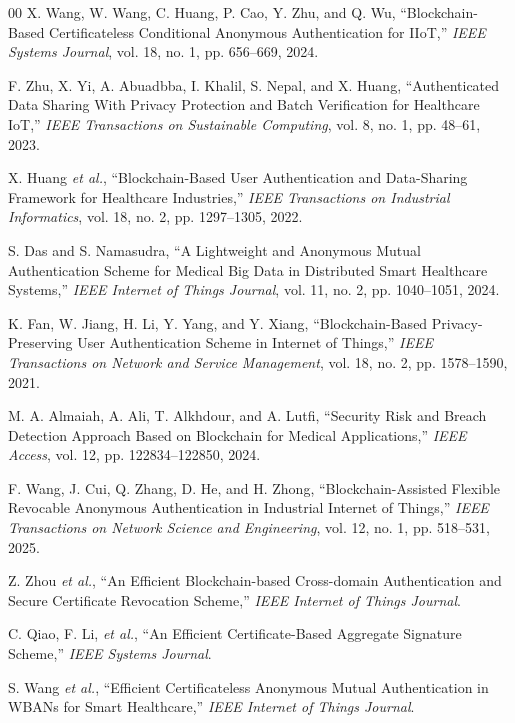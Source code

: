 \documentclass[conference]{IEEEtran}
\begin{document}
\begin{thebibliography}{00}
 X. Wang, W. Wang, C. Huang, P. Cao, Y. Zhu, and Q. Wu,
``Blockchain-Based Certificateless Conditional Anonymous Authentication for IIoT,''
\textit{IEEE Systems Journal}, vol. 18, no. 1, pp. 656--669, 2024.

 F. Zhu, X. Yi, A. Abuadbba, I. Khalil, S. Nepal, and X. Huang,
``Authenticated Data Sharing With Privacy Protection and Batch Verification for Healthcare IoT,''
\textit{IEEE Transactions on Sustainable Computing}, vol. 8, no. 1, pp. 48--61, 2023.

 X. Huang \textit{et al.},
``Blockchain-Based User Authentication and Data-Sharing Framework for Healthcare Industries,''
\textit{IEEE Transactions on Industrial Informatics}, vol. 18, no. 2, pp. 1297--1305, 2022.

 S. Das and S. Namasudra,
``A Lightweight and Anonymous Mutual Authentication Scheme for Medical Big Data in Distributed Smart Healthcare Systems,''
\textit{IEEE Internet of Things Journal}, vol. 11, no. 2, pp. 1040--1051, 2024.

 K. Fan, W. Jiang, H. Li, Y. Yang, and Y. Xiang,
``Blockchain-Based Privacy-Preserving User Authentication Scheme in Internet of Things,''
\textit{IEEE Transactions on Network and Service Management}, vol. 18, no. 2, pp. 1578--1590, 2021.

 M. A. Almaiah, A. Ali, T. Alkhdour, and A. Lutfi,
``Security Risk and Breach Detection Approach Based on Blockchain for Medical Applications,''
\textit{IEEE Access}, vol. 12, pp. 122834--122850, 2024.

 F. Wang, J. Cui, Q. Zhang, D. He, and H. Zhong,
``Blockchain-Assisted Flexible Revocable Anonymous Authentication in Industrial Internet of Things,''
\textit{IEEE Transactions on Network Science and Engineering}, vol. 12, no. 1, pp. 518--531, 2025.

 Z. Zhou \textit{et al.},
``An Efficient Blockchain-based Cross-domain Authentication and Secure Certificate Revocation Scheme,''
\textit{IEEE Internet of Things Journal}.

 C. Qiao, F. Li, \textit{et al.},
``An Efficient Certificate-Based Aggregate Signature Scheme,''
\textit{IEEE Systems Journal}.

 S. Wang \textit{et al.},
``Efficient Certificateless Anonymous Mutual Authentication in WBANs for Smart Healthcare,''
\textit{IEEE Internet of Things Journal}.


\end{thebibliography}
\end{document}
